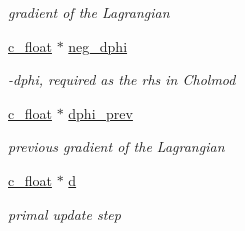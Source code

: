 \begin{Indent}
\begin{DoxyCompactItemize}
\begin{DoxyCompactList}\small\item\em gradient of the Lagrangian \end{DoxyCompactList}\item 
\mbox{\hyperlink{global__opts_8h_a7f1a9fda95e52979658c20a0d134fb15}{c\+\_\+float}} $\ast$ \mbox{\hyperlink{structQPALMWorkspace_a771d4ed92094edc40f650ed185178acd}{neg\+\_\+dphi}}
\begin{DoxyCompactList}\small\item\em -\/dphi, required as the rhs in Cholmod \end{DoxyCompactList}\item 
\mbox{\hyperlink{global__opts_8h_a7f1a9fda95e52979658c20a0d134fb15}{c\+\_\+float}} $\ast$ \mbox{\hyperlink{structQPALMWorkspace_a93d1329aebe7dba2d38645412de43f92}{dphi\+\_\+prev}}
\begin{DoxyCompactList}\small\item\em previous gradient of the Lagrangian \end{DoxyCompactList}\item 
\mbox{\hyperlink{global__opts_8h_a7f1a9fda95e52979658c20a0d134fb15}{c\+\_\+float}} $\ast$ \mbox{\hyperlink{structQPALMWorkspace_afa68534735d876db13ce5deab9f1e953}{d}}
\begin{DoxyCompactList}\small\item\em primal update step \end{DoxyCompactList}\end{DoxyCompactItemize}
\end{Indent}
